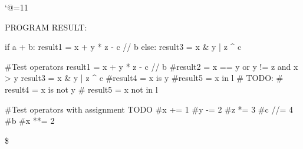 \let\e\expandafter
\catcode`@=11








\def\@pytexChar@Backslash{\loggingall\@pytexParser@parse}
\let\@pytexChar@Dollar\bye

%

PROGRAM RESULT:

\@pytexCatcodes@setallactive


if a + b:
	result1 = x + y * z - c // b %
else:
	result3 = x & y | z ^ c


#Test operators
result1 = x + y * z - c // b %
#result2 = x == y or y != z and x > y
result3 = x & y | z ^ c
#result4 = x is y
#result5 = x in l
# TODO:
# result4 = x is not y
# result5 = x not in l

#Test operators with assignment TODO
#x += 1
#y -= 2
#z *= 3
#c //= 4
#b %
#x **= 2






\$
\bye
